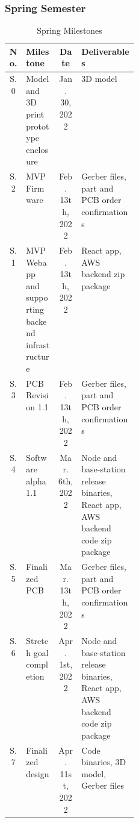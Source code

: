 \subsubsection{Spring Semester}
\begin{table}[H]
  \footnotesize  
  \caption{Spring Milestones}

  \begin{tabularx}{\linewidth}{| c | p{0.25\linewidth} | c | X |}
    \hline
    No. & Milestone & Date & Deliverables 
    \\\hline\hline

    S.0 
    & Model and 3D print prototype enclosure
    & Jan. 30, 2022
    & 3D model
    \\\hline

    S.2 
    & MVP Firmware
    & Feb. 13th, 2022 
    & Gerber files, part and PCB order confirmations
    \\\hline

    S.1 
    & MVP Webapp and supporting backend infrastructure
    & Feb. 13th, 2022 
    & React app, AWS backend zip package
    \\\hline

    S.3 
    & PCB Revision 1.1
    & Feb. 13th, 2022 
    & Gerber files, part and PCB order confirmations
    \\\hline

    S.4 
    & Software alpha 1.1 
    & Mar. 6th, 2022 
    & Node and base-station release binaries, React app, AWS backend code zip package 
    \\\hline

    S.5
    & Finalized PCB
    & Mar. 13th, 2022 
    & Gerber files, part and PCB order confirmations
    \\\hline

    S.6 
    & Stretch goal completion
    & Apr. 1st, 2022
    & Node and base-station release binaries, React app, AWS backend code zip package 
    \\\hline

    S.7 
    & Finalized design
    & Apr. 11st, 2022
    & Code binaries, 3D model, Gerber files
    \\\hline

  \end{tabularx}
  \label{tab:spring-milestones}
\end{table}

